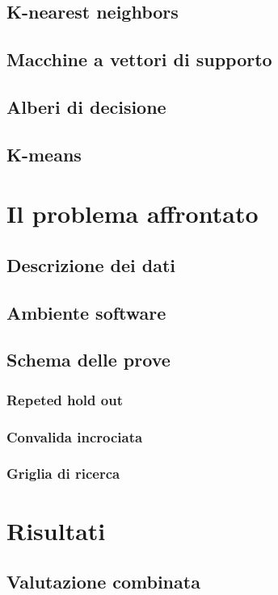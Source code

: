 \documentclass[a4paper,12pt]{report}
\begin{document}
\section{K-nearest neighbors}
\section{Macchine a vettori di supporto}
\section{Alberi di decisione}
\section{K-means}

% 
% 
\chapter{Il problema affrontato}
\label{cap2}
\section{Descrizione dei dati}
\section{Ambiente software}
\section{Schema delle prove}
\subsection{Repeted hold out}
\subsection{Convalida incrociata}
\subsection{Griglia di ricerca}


% 
% 
\chapter{Risultati}
\label{cap3}
\section{Valutazione combinata}
\end{document}
